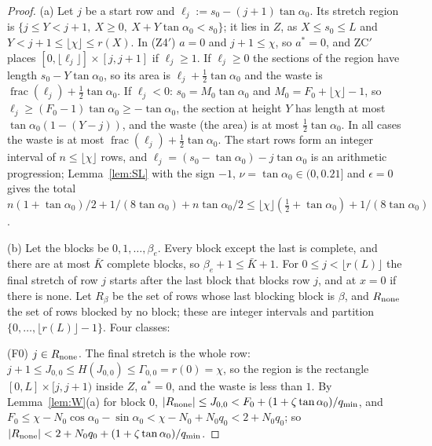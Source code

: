 \documentclass[11pt]{amsart}
\newcommand{\caz}{\cos\alpha_0}
\newcommand{\saz}{\sin\alpha_0}
\newcommand{\taz}{\tan\alpha_0}
\newcommand{\Kb}{\bar K}
\theoremstyle{definition}
\theoremstyle{remark}
\numberwithin{equation}{section}
\begin{document}
\begin{proof}
(a) Let $j$ be a start row and $\ell_j:=s_0-(j+1)\taz$. Its stretch region is
$\{j\le Y<j+1,\ X\ge0,\ X+Y\taz<s_0\}$; it lies in $Z$, as $X\le s_0\le L$ and $Y<j+1\le\lfloor\chi\rfloor\le r(X)$. In
(Z4$'$) $a=0$ and $j+1\le\chi$, so $a^*=0$, and ZC$'$ places $[0,\lfloor\ell_j\rfloor]\times[j,j+1]$ if $\ell_j\ge1$. If
$\ell_j\ge0$ the sections of the region have length $s_0-Y\taz$, so its area is $\ell_j+\frac12\taz$ and the waste is
$\operatorname{frac}(\ell_j)+\frac12\taz$. If $\ell_j<0$: $s_0=M_0\taz$ and $M_0=F_0+\lfloor\chi\rfloor-1$, so
$\ell_j\ge(F_0-1)\taz\ge-\taz$, the section at height $Y$ has length at most $\taz(1-(Y-j))$, and the waste (the area) is
at most $\frac12\taz$. In all cases the waste is at most $\operatorname{frac}(\ell_j)+\frac12\taz$. The start rows form
an integer interval of $n\le\lfloor\chi\rfloor$ rows, and $\ell_j=(s_0-\taz)-j\taz$ is an arithmetic progression; Lemma~\ref{lem:SL}
with the sign $-1$, $\nu=\taz\in(0,0.21]$ and $\epsilon=0$ gives the total
$n(1+\taz)/2+1/(8\taz)+n\taz/2\le\lfloor\chi\rfloor(\frac12+\taz)+1/(8\taz)$.

(b) Let the blocks be $0,1,\dots,\beta_e$. Every block except the last is complete, and there are at most $\Kb$ complete
blocks, so $\beta_e+1\le\Kb+1$. For $0\le j<\lfloor r(L)\rfloor$ the final stretch of row $j$ starts after the last block
that blocks row $j$, and at $x=0$ if there is none. Let $R_\beta$ be the set of rows whose last blocking block is $\beta$,
and $R_{\rm none}$ the set of rows blocked by no block; these are integer intervals and partition
$\{0,\dots,\lfloor r(L)\rfloor-1\}$. Four classes:

(F0) $j\in R_{\rm none}$. The final stretch is the whole row: $j+1\le J_{0,0}\le H(J_{0,0})\le\Gamma_{0,0}=r(0)=\chi$, so the
region is the rectangle $[0,L]\times[j,j+1)$ inside $Z$, $a^*=0$, and the waste is less than $1$. By
Lemma~\ref{lem:W}(a) for block $0$, $|R_{\rm none}|\le J_{0,0}<F_0+(1+\zeta\taz)/q_{\min}$, and
$F_0\le\chi-N_0\caz-\saz<\chi-N_0+N_0q_0<2+N_0q_0$; so $|R_{\rm none}|<2+N_0q_0+(1+\zeta\taz)/q_{\min}$.


\end{proof}
\end{document}
